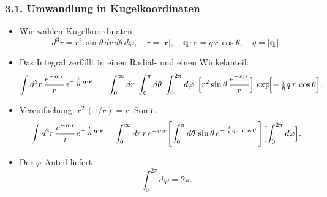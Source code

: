 \documentclass{scrartcl}
\begin{document}
\subsubsection*{3.1. Umwandlung in Kugelkoordinaten}
\begin{itemize}
  \item Wir wählen Kugelkoordinaten: 
    \[
      d^{3}r = r^{2}\,\sin\theta\,dr\,d\theta\,d\varphi,\quad
      r = |\boldsymbol{r}|,\quad
      \boldsymbol{q}\cdot\boldsymbol{r} = q\,r\,\cos\theta,
      \quad q = |\boldsymbol{q}\,|.
    \]
  \item Das Integral zerfällt in einen Radial- und einen Winkelanteil:
  \[
    \int d^{3}r\,\frac{e^{-m r}}{r}e^{-\,\tfrac{i}{\hbar}\,\boldsymbol{q}\cdot\boldsymbol{r}}
    \;=\;
    \int_{0}^{\infty} dr\;\int_{0}^{\pi} d\theta\;\int_{0}^{2\pi} d\varphi\;
    \,\Bigl[r^{2}\sin\theta\,\frac{e^{-m r}}{r}\Bigr]\,
    \exp\!\Bigl[-\,\tfrac{i}{\hbar}q\,r\,\cos\theta\Bigr].
  \]
  \item Vereinfachung: $r^{2}\,(1/r) = r$. Somit
  \[
    \int d^{3}r\,\frac{e^{-m r}}{r}e^{-\,\tfrac{i}{\hbar}\,\boldsymbol{q}\cdot\boldsymbol{r}}
    =
    \int_{0}^{\infty} dr\,r\,e^{-m r}
    \Biggl[\int_{0}^{\pi} d\theta\,\sin\theta\,
    e^{-\,\tfrac{i}{\hbar}q\,r\,\cos\theta}\,\Biggr]
    \Bigl[\int_{0}^{2\pi} d\varphi\Bigr].
  \]
  \item Der $\varphi$-Anteil liefert 
  \[
    \int_{0}^{2\pi} d\varphi = 2\pi.
  \]
\end{itemize}
\end{document}
